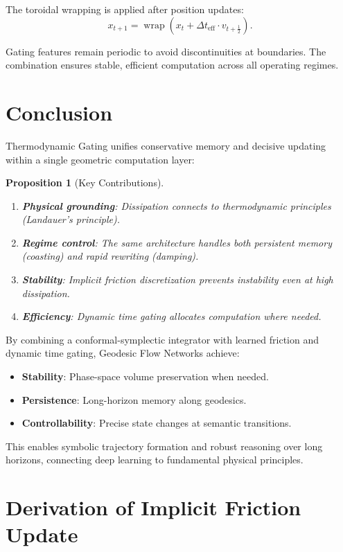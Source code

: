 \documentclass[12pt,letterpaper,twoside]{article}
\newtheorem{prop}{Proposition}[section]
\begin{document}
The toroidal wrapping is applied after position updates:
\[
x_{t+1} = \operatorname{wrap}(x_t + \Delta t_{\text{eff}} \cdot v_{t+\frac{1}{2}}).
\]

Gating features remain periodic to avoid discontinuities at boundaries. The combination ensures stable, efficient computation across all operating regimes.

\section{Conclusion}

Thermodynamic Gating unifies conservative memory and decisive updating within a single geometric computation layer:

\begin{prop}[Key Contributions]
\begin{enumerate}
\item \textbf{Physical grounding}: Dissipation connects to thermodynamic principles (Landauer's principle).
\item \textbf{Regime control}: The same architecture handles both persistent memory (coasting) and rapid rewriting (damping).
\item \textbf{Stability}: Implicit friction discretization prevents instability even at high dissipation.
\item \textbf{Efficiency}: Dynamic time gating allocates computation where needed.
\end{enumerate}
\end{prop}

By combining a conformal-symplectic integrator with learned friction and dynamic time gating, Geodesic Flow Networks achieve:

\begin{itemize}
\item \textbf{Stability}: Phase-space volume preservation when needed.
\item \textbf{Persistence}: Long-horizon memory along geodesics.
\item \textbf{Controllability}: Precise state changes at semantic transitions.
\end{itemize}

This enables symbolic trajectory formation and robust reasoning over long horizons, connecting deep learning to fundamental physical principles.

\clearpage

\appendix

\section{Derivation of Implicit Friction Update}
\end{document}
